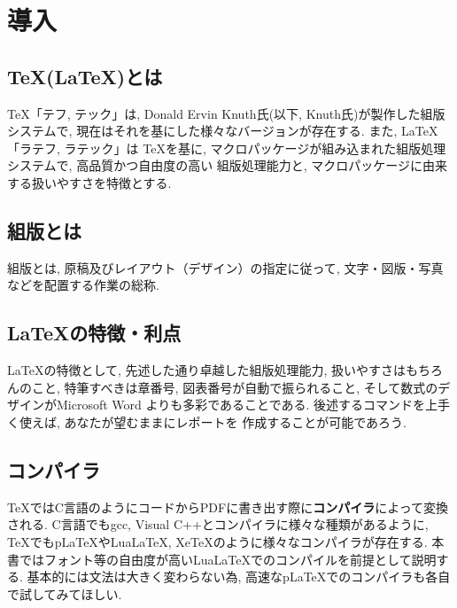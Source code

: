 \section{導入}
\subsection{\TeX(\LaTeX)とは}
\TeX 「テフ, テック」は, Donald Ervin Knuth氏(以下, Knuth氏)が製作した組版システム\cite{W3C2021}で, 
現在はそれを基にした様々なバージョンが存在する. また, \LaTeX 「ラテフ, ラテック」は
\TeX を基に, マクロパッケージが組み込まれた組版処理システムで, 高品質かつ自由度の高い
組版処理能力と, マクロパッケージに由来する扱いやすさを特徴とする. 
\subsection{組版とは}
組版とは, 原稿及びレイアウト（デザイン）の指定に従って, 文字・図版・写真などを配置する作業の総称. 
\subsection{\LaTeX の特徴・利点}
\LaTeX の特徴として, 先述した通り卓越した組版処理能力, 扱いやすさはもちろんのこと, 
特筆すべきは章番号, 図表番号が自動で振られること, そして数式のデザインがMicrosoft Word
よりも多彩であることである. 後述するコマンドを上手く使えば, あなたが望むままにレポートを
作成することが可能であろう. 
\subsection{コンパイラ}
\TeX ではC言語のようにコードからPDFに書き出す際に\textbf{コンパイラ}によって変換される. 
C言語でもgcc, Visual C++とコンパイラに様々な種類があるように, \TeX でもpLaTeXやLuaLaTeX, 
XeTeXのように様々なコンパイラが存在する. 
本書ではフォント等の自由度が高いLuaLaTeXでのコンパイルを前提として説明する. 
基本的には文法は大きく変わらない為, 高速なpLaTeXでのコンパイラも各自で試してみてほしい. 